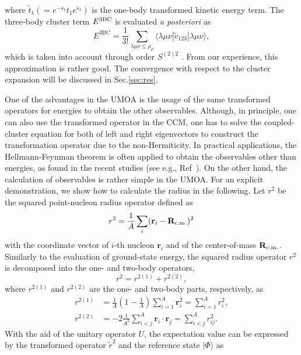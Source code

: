 \documentclass[aps,prc, dvips, twocolumn,groupedaddress,showkeys,showpacs,floatfix,superscriptaddress]{revtex4-1}
\newcommand{\<}{\langle}
\renewcommand{\>}{\rangle}
\begin{document}
where $\widetilde{t}_{1} (= e^{-s_{1}} t_{1}e^{s_{1}})$ is the one-body transformed kinetic energy term.
The three-body cluster term $E^{{\rm 3BC}}$ is evaluated {\it a posteriori} as
\begin{equation}
E^{\text{3BC}}= \frac{1}{3!} \sum_{\lambda\mu\nu \le \rho_{F}}
 \<\lambda\mu\nu|\widetilde{v}_{123}|\lambda\mu\nu\>,
\end{equation}
 which is taken into account through order $S^{(2)2}$ \cite{Suzuki:1994}.
From our experience, this approximation is rather good.
The convergence with respect to the cluster expansion will be discussed in Sec.\ref{sec:res}.

One of the advantages in the UMOA is the usage of the same transformed
 operators for energies to obtain the other observables.
 Although, in principle, one can also use the transformed operator in the CCM,
one has to solve the coupled-cluster equation for both of
 left and right eigenvectors to construct the transformation operator due to the non-Hermiticity.
In practical applications, the Hellmann-Feynman theorem is often applied
to obtain the observables other than energies, as found in the recent studies (see e.g., Ref~\cite{Hagen:2014}).
On the other hand, the calculation of observables is rather simple in the UMOA.
For an explicit demonstration, we show how to calculate the radius in the following.
Let $r^{2}$ be the squared point-nucleon radius operator defined as
\begin{equation}
  r^{2} = \frac{1}{A}\sum_{i}({\mathbf r}_{i} - {\mathbf R}_{{\rm c.m.}})^{2}
\end{equation}
with the coordinate vector of $i$-th nucleon ${\mathbf r}_{i}$ and of
 the center-of-mass ${\mathbf R}_{{\rm c.m.}}$.
Similarly to the evaluation of ground-state energy,
the squared radius operator $r^{2}$ is decomposed into the one- and two-body operators,
\begin{equation}
  r^{2}=r^{2(1)}+r^{2(2)},
\end{equation}
where $r^{2(1)}$ and $r^{2(2)}$ are the one- and two-body parts, respectively, as
\begin{align}
  r^{2(1)} &= \frac{1}{A} \left(1 - \frac{1}{A} \right)
  \sum_{i=1}^{A} \mathbf{r}^{2}_{i} = \sum_{i = 1}^{A} r_{i}^{2}, \\
 r^{2(2)}&=  - 2\frac{1}{A^{2}} \sum_{i<j}^{A}
  \mathbf{r}_{i} \cdot \mathbf{r}_{j} = \sum_{i<j}^{A} r_{ij}^{2}.
\end{align}
With the aid of the unitary operator $U$, the expectation value
can be expressed by the transformed operator $\widetilde{r}^{2}$ and the reference state $|\Phi\>$ as
\end{document}
